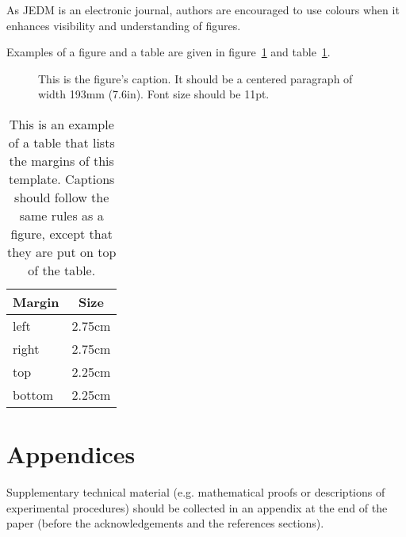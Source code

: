 \documentclass[notitlepage,12pt]{jedm}
\begin{document}
As JEDM is an electronic journal, authors are encouraged to use colours when it enhances visibility and understanding of figures.

Examples of a figure and a table are given in figure~\ref{tab:fig1} and table~\ref{tab:1}.

\begin{figure}
  \centerline{}
  \caption{This is the figure's caption.  It should be a centered paragraph of width 193mm (7.6in). Font size should be 11pt.}
  \label{tab:fig1}
\end{figure}

\begin{table}
  \caption{This is an example of a table that lists the margins of this template.  Captions should follow the same rules as a figure, except that they are put on top of the table.}\vspace*{1ex}
  \label{tab:1}
  \centering
  \begin{tabular}{| l | l |}
    \hline
    \multicolumn{1}{|c|}{\textbf{Margin}} & \multicolumn{1}{c|}{\textbf{Size}} \\
    \hline
    left&2.75cm\\
    right&2.75cm\\
    top&2.25cm\\
    bottom&2.25cm\\
    \hline
  \end{tabular}
\end{table}

\section{Appendices}

Supplementary technical material (e.g. mathematical proofs or descriptions of experimental procedures) should be collected in an appendix at the end of the paper (before the acknowledgements and the references sections).
\end{document}
